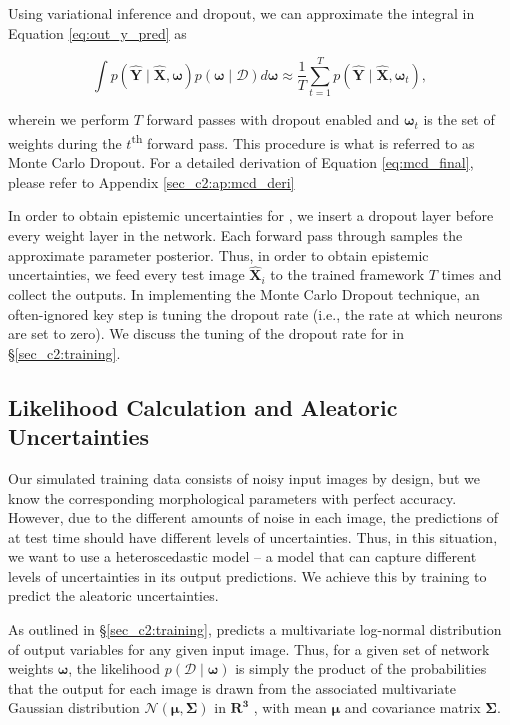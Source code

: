 Using variational inference and dropout, we can approximate the integral in Equation \ref{eq:out_y_pred} as 

\begin{equation}
\int p(\boldsymbol{\hat{Y}} \mid \boldsymbol{\hat{X}}, \boldsymbol{\omega}) p(\boldsymbol{\omega} \mid \mathcal{D}) d \boldsymbol{\omega} \approx \frac{1}{T} \sum_{t=1}^{T} p(\boldsymbol{\hat{Y}} \mid \boldsymbol{\hat{X}}, \boldsymbol{\omega}_t) ,
\label{eq:mcd_final}
\end{equation}

\noindent
wherein we perform $T$ forward passes with dropout enabled and $\boldsymbol{\omega}_t$ is the set of weights during the $t$\textsuperscript{th} forward pass. This procedure is what is referred to as Monte Carlo Dropout. For a detailed derivation of Equation \ref{eq:mcd_final}, please refer to Appendix \ref{sec_c2:ap:mcd_deri}

In order to obtain epistemic uncertainties for \gampen{}, we insert a dropout layer before every weight layer in the network. Each forward pass through \gampen{} samples the approximate parameter posterior. Thus, in order to obtain epistemic uncertainties, we feed every test image $\boldsymbol{\hat{X}}_i$ to the trained \gampen{} framework $T$ times and collect the outputs. In implementing the Monte Carlo Dropout technique, an often-ignored key step is tuning the dropout rate (i.e., the rate at which neurons are set to zero). We discuss the tuning of the dropout rate for \gampen{} in \S \ref{sec_c2:training}.

\vspace{0.8cm}


\subsection{Likelihood Calculation and Aleatoric Uncertainties}
\label{subsec_c2:aleatoric}
Our simulated training data consists of noisy input images by design, but we know the corresponding morphological parameters with perfect accuracy. However, due to the different amounts of noise in each image, the predictions of \gampen{} at test time should have different levels of uncertainties. Thus, in this situation, we want to use a heteroscedastic model -- a model that can capture different levels of uncertainties in its output predictions. We achieve this by training \gampen{} to predict the aleatoric uncertainties. 

As outlined in \S \ref{sec_c2:training}, \gampen{} predicts a multivariate log-normal distribution of output variables for any given input image. Thus, for a given set of network weights $\boldsymbol{\omega}$, the likelihood $p(\mathcal{D} \mid \boldsymbol{\omega})$ is simply the product of the probabilities that the \gampen{} output for each image is drawn from the associated multivariate Gaussian distribution $\mathcal{N}(\boldsymbol{\mu}, \boldsymbol{\Sigma})$ in $\mathbf{R^3}$ , with mean $\boldsymbol{\mu}$ and covariance matrix $\boldsymbol{\Sigma}$.

